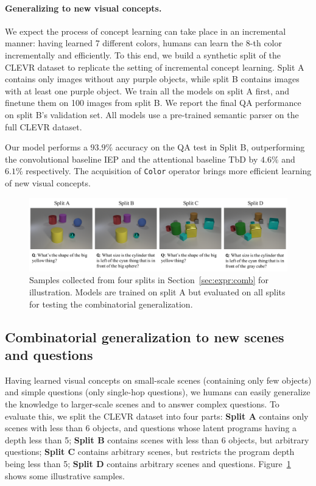 \documentclass{article} %
\newcommand{\sect}[1]{Section~\ref{#1}}
\newcommand{\myparagraph}[1]{\vspace{-3pt}\paragraph{#1}}
\begin{document}
\myparagraph{Generalizing to new visual concepts.} We expect the process of concept learning can take place in an incremental manner: having learned 7 different colors, humans can learn the 8-th color incrementally and efficiently. To this end, we build a synthetic split of the CLEVR dataset to replicate the setting of incremental concept learning. Split A contains only images without any purple objects, while split B contains images with at least one purple object. We train all the models on split A first, and finetune them on 100 images from split B. We report the final QA performance on split B's validation set. All models use a pre-trained semantic parser on the full CLEVR dataset. 

Our model performs a $93.9\%$ accuracy on the QA test in Split B, outperforming the convolutional baseline IEP \citep{Johnson2017Inferring} and the attentional baseline TbD \citep{Mascharka2018Transparency} by $4.6\%$ and $6.1\%$ respectively. The acquisition of \texttt{Color} operator brings more efficient learning of new visual concepts.

%
\begin{figure}[t]
\centering
%
\includegraphics[width=\textwidth]{raw/ExampleCombinatorial.pdf}
\vspace{-20pt}
\caption{Samples collected from four splits in \sect{sec:expr:comb} for illustration. Models are trained on split A but evaluated on all splits for testing the combinatorial generalization.}
\vspace{-5pt}
\label{fig:example-comb}
\end{figure}
 
\subsection{Combinatorial generalization to new scenes and questions}

Having learned visual concepts on small-scale scenes (containing only few objects) and simple questions (only single-hop questions), we humans can easily generalize the knowledge to larger-scale scenes and to answer complex questions. %
To evaluate this, we split the CLEVR dataset into four parts: \textbf{Split A} contains only scenes with less than 6 objects, and questions whose latent programs having a depth less than 5; %
\textbf{Split B} contains scenes with less than 6 objects, but arbitrary questions; \textbf{Split C} contains arbitrary scenes, but restricts the program depth being less than 5; \textbf{Split D} contains arbitrary scenes and questions. Figure~\ref{fig:example-comb} shows some illustrative samples.
\end{document}
